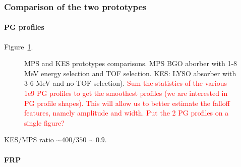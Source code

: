 \documentclass[a4paper,english]{article}
\begin{document}
\subsubsection{Comparison of the two prototypes}

\paragraph{PG profiles}

Figure~\ref{PGprofileProtoComp}.

\begin{figure}[!htp]
  \centering
  \quad
  \caption{\label{PGprofileProtoComp} MPS and KES prototypes comparisons. MPS BGO aborber with 1-8 MeV energy selection and TOF selection. KES: LYSO absorber with 3-6 MeV and no TOF selection). \textcolor{red}{Sum the statistics of the various 1e9 PG profiles to get the smoothest profiles (we are interested in PG profile shapes). This will allow us to better estimate the falloff features, namely amplitude and width. Put the 2 PG profiles on a single figure?}}
\end{figure}  

KES/MPS ratio $\sim 400/350 \sim 0.9$.

\paragraph{FRP}
\end{document}
